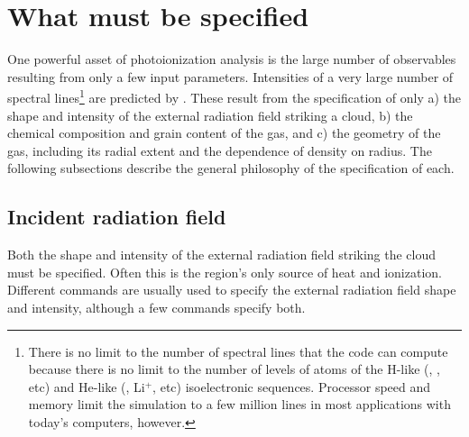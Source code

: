 \section{What must be specified}

\noindent
One powerful asset of photoionization analysis is the large number of
observables resulting from only a few input parameters.
Intensities of a very large number of spectral lines\footnote{
There is no limit to the number of spectral lines that the code can
compute because there is no limit to the number of levels of atoms of the
H-like (\hO, \heplus, etc) and He-like (\heO, Li$^+$, etc)
isoelectronic sequences.
Processor speed and memory limit the simulation to a few million lines in
most applications with today's computers, however.}
are predicted by \Cloudy.  These result
from the specification of only a) the shape and intensity of the external
radiation field striking a cloud,
b) the chemical composition and grain content of the gas, and c) the geometry
of the gas, including its radial extent and the dependence of density on
radius.  The following subsections describe the general philosophy of the
specification of each.

\subsection{Incident radiation field}

\noindent Both the shape and intensity of the external radiation field striking the cloud
must be specified.
Often this is the region's only source of heat and
ionization.
Different commands are usually used to specify the external radiation field
shape and intensity, although a few commands specify both.

